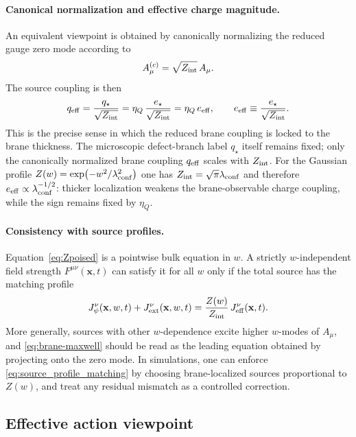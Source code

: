 \documentclass[11pt]{article}
\newcommand{\etaQ}{\eta_Q}
\newcommand{\estar}{e_\star}
\newcommand{\eeff}{e_{\rm eff}}
\newcommand{\qstar}{q_\star}
\newcommand{\qeff}{q_{\rm eff}}
\newcommand{\Zint}{Z_{\rm int}}
\begin{document}
\paragraph{Canonical normalization and effective charge magnitude.}
An equivalent viewpoint is obtained by canonically normalizing the reduced gauge zero mode according to
\begin{equation}
A_\mu^{(c)}=\sqrt{\Zint}\,A_\mu.
\end{equation}
The source coupling is then
\begin{equation}
\qeff=\frac{\qstar}{\sqrt{\Zint}}=\etaQ\,\frac{\estar}{\sqrt{\Zint}}=\etaQ\,\eeff,
\qquad
\eeff\equiv \frac{\estar}{\sqrt{\Zint}}.
\label{eq:qeff-canonical}
\end{equation}
This is the precise sense in which the reduced brane coupling is locked to the brane thickness. The microscopic defect-branch label $\qstar$ itself remains fixed; only the canonically normalized brane coupling $\qeff$ scales with $\Zint$. For the Gaussian profile $Z(w)=\exp(-w^2/\lambda_{\rm conf}^2)$ one has $\Zint=\sqrt{\pi}\lambda_{\rm conf}$ and therefore $\eeff\propto \lambda_{\rm conf}^{-1/2}$: thicker localization weakens the brane-observable charge coupling, while the sign remains fixed by $\etaQ$.

\paragraph{Consistency with source profiles.} Equation~\eqref{eq:Zpoised} is a pointwise bulk equation in $w$. A strictly $w$-independent field strength $F^{\mu\nu}(\mathbf x,t)$ can satisfy it for all $w$ only if the total source has the matching profile
\begin{equation}
J_\psi^\nu(\mathbf x,w,t)+J_{\rm ext}^\nu(\mathbf x,w,t)=\frac{Z(w)}{Z_{\rm int}}\,J_{\rm eff}^\nu(\mathbf x,t).
\label{eq:source_profile_matching}
\end{equation}
More generally, sources with other $w$-dependence excite higher $w$-modes of $A_\mu$, and \eqref{eq:brane-maxwell} should be read as the leading equation obtained by projecting onto the zero mode. In simulations, one can enforce \eqref{eq:source_profile_matching} by choosing brane-localized sources proportional to $Z(w)$, and treat any residual mismatch as a controlled correction.


\subsection{Effective action viewpoint}
\label{sec:emreduction-action}
\end{document}
